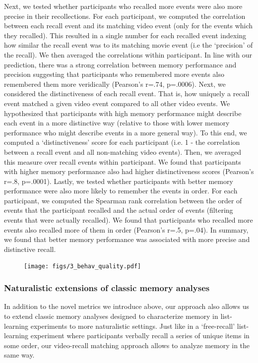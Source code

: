 \documentclass[a4paper,man,natbib,floatsintext]{apa6}
\begin{document}
Next, we tested whether participants who recalled more events were also more precise in their recollections. For each participant, we computed the correlation between each recall event and its matching video event (only for the events which they recalled). This resulted in a single number for each recalled event indexing how similar the recall event was to its matching movie event (i.e the `precision' of the recall). We then averaged the correlations within participant. In line with our prediction, there was a strong correlation between memory performance and precision suggesting that participants who remembered more events also remembered them more veridically (Pearson's r=.74, p=.0006). Next, we considered the distinctiveness of each recall event. That is, how uniquely a recall event matched a given video event compared to all other video events. We hypothesized that participants with high memory performance might describe each event in a more distinctive way (relative to those with lower memory performance who might describe events in a more general way). To this end, we computed a `distinctiveness' score for each participant (i.e. 1 - the correlation between a recall event and all non-matching video events).  Then, we averaged this measure over recall events within participant.  We found that participants with higher memory performance also had higher distinctiveness scores (Pearson's r=.8, p=.0001). Lastly, we tested whether participants with better memory performance were also more likely to remember the events in order.  For each participant, we computed the Spearman rank correlation between the order of events that the participant recalled and the actual order of events (filtering events that were actually recalled).  We found that participants who recalled more events also recalled more of them in order (Pearson's r=.5, p=.04). In summary, we found that better memory performance was associated with more precise and distinctive recall.

\begin{figure}[t!]
\centering
\texttt{[image: figs/3\_behav\_quality.pdf]}
\caption{\label{fig:behav}
}
\end{figure}


\subsubsection{Naturalistic extensions of classic memory analyses}
In addition to the novel metrics we introduce above, our approach also allows us to extend classic memory analyses designed to characterize memory in list-learning experiments to more naturalistic settings. Just like in a `free-recall' list-learning experiment where participants verbally recall a series of unique items in some order, our video-recall matching approach allows to analyze memory in the same way.
\end{document}
